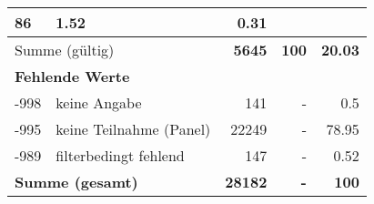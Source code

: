 \begin{longtable}{lXrrr}
       \num{86} &
       \num[round-mode=places,round-precision=2]{1,52} &
         \num[round-mode=places,round-precision=2]{0,31} \\
     \midrule
     \multicolumn{2}{l}{Summe (gültig)} &
       \textbf{\num{5645}} &
     \textbf{100} &
       \textbf{\num[round-mode=places,round-precision=2]{20,03}} \\
     \multicolumn{5}{l}{\textbf{Fehlende Werte}}\\
       -998 &
       keine Angabe &
         \num{141} &
        - &
         \num[round-mode=places,round-precision=2]{0,5} \\
       -995 &
       keine Teilnahme (Panel) &
         \num{22249} &
        - &
         \num[round-mode=places,round-precision=2]{78,95} \\
       -989 &
       filterbedingt fehlend &
         \num{147} &
        - &
         \num[round-mode=places,round-precision=2]{0,52} \\
     \midrule
     \multicolumn{2}{l}{\textbf{Summe (gesamt)}} &
          \textbf{\num{28182}} &
        \textbf{-} &
        \textbf{100} \\
     \bottomrule
     \end{longtable}
     

